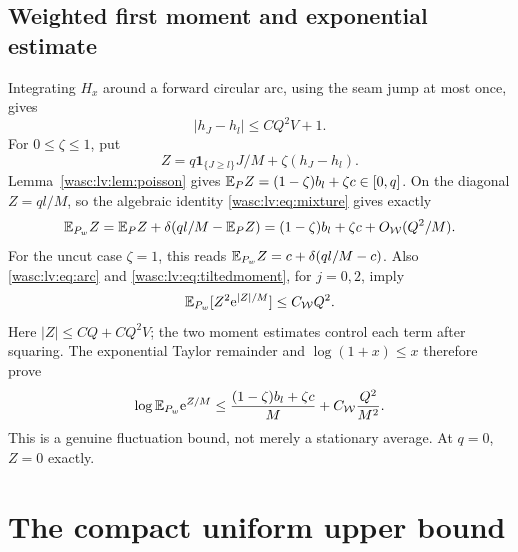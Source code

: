 \documentclass[11pt,a4paper]{article}
\theoremstyle{remark}\newtheorem{remark}[theorem]{Remark}
\newcommand{\ind}{\mathbf 1}\newcommand{\wasc}{\operatorname{wasc}}\newcommand{\dasc}{\operatorname{dasc}}
\numberwithin{equation}{section}
\begin{document}
\subsection{Weighted first moment and exponential estimate}
Integrating $H_x$ around a forward circular arc, using the seam jump at most once, gives
\begin{equation}\label{wasc:lv:eq:arc}
|h_J-h_l|\le CQ^2V+1.
\end{equation}
For $0\le\zeta\le1$, put
\begin{equation}\label{wasc:lv:eq:Z}
Z=q\ind_{\{J\ge l\}}J/M+\zeta(h_J-h_l).
\end{equation}
Lemma~\ref{wasc:lv:lem:poisson} gives $\mathbb E_PZ=(1-\zeta)b_l+\zeta c\in[0,q]$. On the diagonal $Z=ql/M$, so the algebraic identity \eqref{wasc:lv:eq:mixture} gives exactly
\begin{equation}\label{wasc:lv:eq:weightedZ}
\mathbb E_{P_w}Z=\mathbb E_PZ+\delta(ql/M-\mathbb E_PZ)
=(1-\zeta)b_l+\zeta c+O_{\mathcal W}(Q^2/M).
\end{equation}
For the uncut case $\zeta=1$, this reads $\mathbb E_{P_w}Z=c+\delta(ql/M-c)$.
Also \eqref{wasc:lv:eq:arc} and \eqref{wasc:lv:eq:tiltedmoment}, for $j=0,2$, imply
\begin{equation}\label{wasc:lv:eq:Zmoment}
\mathbb E_{P_w}[Z^2\mathrm e^{|Z|/M}]\le C_{\mathcal W}Q^2.
\end{equation}
Here $|Z|\le CQ+CQ^2V$; the two moment estimates control each term after squaring.
The exponential Taylor remainder and $\log(1+x)\le x$ therefore prove
\begin{equation}\label{wasc:lv:eq:expZ}
\log\mathbb E_{P_w}\mathrm e^{Z/M}\le\frac{(1-\zeta)b_l+\zeta c}{M}
+C_{\mathcal W}\frac{Q^2}{M^2}.
\end{equation}
This is a genuine fluctuation bound, not merely a stationary average. At $q=0$, $Z=0$ exactly.

\section{The compact uniform upper bound}\label{wasc:lv:sec:upper}
\end{document}
